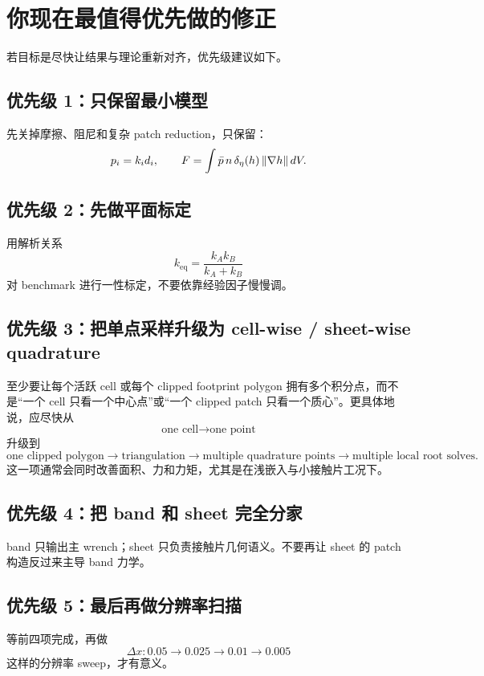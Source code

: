\documentclass[12pt,a4paper]{ctexart}
\begin{document}
\section{你现在最值得优先做的修正}

若目标是尽快让结果与理论重新对齐，优先级建议如下。

\subsection{优先级 1：只保留最小模型}
先关掉摩擦、阻尼和复杂 patch reduction，只保留：
\begin{equation}
    p_i=k_i d_i,
    \qquad
    F = \int \bar p\,n\,\delta_\eta(h)\,\norm{\nabla h}\,dV.
\end{equation}

\subsection{优先级 2：先做平面标定}
用解析关系
\begin{equation}
    k_{\mathrm{eq}}=\frac{k_Ak_B}{k_A+k_B}
\end{equation}
对 benchmark 进行一性标定，不要依靠经验因子慢慢调。

\subsection{优先级 3：把单点采样升级为 cell-wise / sheet-wise quadrature}
至少要让每个活跃 cell 或每个 clipped footprint polygon 拥有多个积分点，而不是“一个 cell 只看一个中心点”或“一个 clipped patch 只看一个质心”。更具体地说，应尽快从
\[
    \text{one cell} \to \text{one point}
\]
升级到
\[
    \text{one clipped polygon} \to \text{triangulation} \to \text{multiple quadrature points} \to \text{multiple local root solves}.
\]
这一项通常会同时改善面积、力和力矩，尤其是在浅嵌入与小接触片工况下。

\subsection{优先级 4：把 band 和 sheet 完全分家}
band 只输出主 wrench；sheet 只负责接触片几何语义。不要再让 sheet 的 patch 构造反过来主导 band 力学。

\subsection{优先级 5：最后再做分辨率扫描}
等前四项完成，再做
\begin{equation}
    \Delta x: 0.05 \to 0.025 \to 0.01 \to 0.005
\end{equation}
这样的分辨率 sweep，才有意义。
\end{document}
